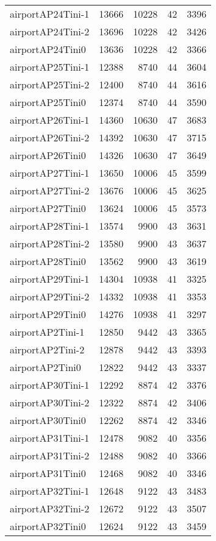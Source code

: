 \begin{tabular}{lrrrr}
airportAP24Tini-1 & 13666 & 10228 & 42 & 3396 \\
airportAP24Tini-2 & 13696 & 10228 & 42 & 3426 \\
airportAP24Tini0 & 13636 & 10228 & 42 & 3366 \\
airportAP25Tini-1 & 12388 & 8740 & 44 & 3604 \\
airportAP25Tini-2 & 12400 & 8740 & 44 & 3616 \\
airportAP25Tini0 & 12374 & 8740 & 44 & 3590 \\
airportAP26Tini-1 & 14360 & 10630 & 47 & 3683 \\
airportAP26Tini-2 & 14392 & 10630 & 47 & 3715 \\
airportAP26Tini0 & 14326 & 10630 & 47 & 3649 \\
airportAP27Tini-1 & 13650 & 10006 & 45 & 3599 \\
airportAP27Tini-2 & 13676 & 10006 & 45 & 3625 \\
airportAP27Tini0 & 13624 & 10006 & 45 & 3573 \\
airportAP28Tini-1 & 13574 & 9900 & 43 & 3631 \\
airportAP28Tini-2 & 13580 & 9900 & 43 & 3637 \\
airportAP28Tini0 & 13562 & 9900 & 43 & 3619 \\
airportAP29Tini-1 & 14304 & 10938 & 41 & 3325 \\
airportAP29Tini-2 & 14332 & 10938 & 41 & 3353 \\
airportAP29Tini0 & 14276 & 10938 & 41 & 3297 \\
airportAP2Tini-1 & 12850 & 9442 & 43 & 3365 \\
airportAP2Tini-2 & 12878 & 9442 & 43 & 3393 \\
airportAP2Tini0 & 12822 & 9442 & 43 & 3337 \\
airportAP30Tini-1 & 12292 & 8874 & 42 & 3376 \\
airportAP30Tini-2 & 12322 & 8874 & 42 & 3406 \\
airportAP30Tini0 & 12262 & 8874 & 42 & 3346 \\
airportAP31Tini-1 & 12478 & 9082 & 40 & 3356 \\
airportAP31Tini-2 & 12488 & 9082 & 40 & 3366 \\
airportAP31Tini0 & 12468 & 9082 & 40 & 3346 \\
airportAP32Tini-1 & 12648 & 9122 & 43 & 3483 \\
airportAP32Tini-2 & 12672 & 9122 & 43 & 3507 \\
airportAP32Tini0 & 12624 & 9122 & 43 & 3459 \\

\end{tabular}
